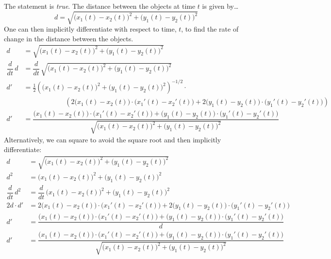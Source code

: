 \documentclass[11pt,letterpaper]{article}
\begin{document}
\sol The statement is \textit{true}. The distance between the objects at time $t$ is given by\dots
	\[
	d= \sqrt{ \big(x_1(t) - x_2(t) \big)^2 + \big(y_1(t) - y_2(t) \big)^2}
	\]
One can then implicitly differentiate with respect to time, $t$, to find the rate of change in the distance between the objects. 
	\[
	\begin{aligned}
	d&= \sqrt{ \big(x_1(t) - x_2(t) \big)^2 + \big(y_1(t) - y_2(t) \big)^2} \\[0.2cm]
	\dfrac{d}{dt} \, d&= \dfrac{d}{dt}\, \sqrt{ \big(x_1(t) - x_2(t) \big)^2 + \big(y_1(t) - y_2(t) \big)^2} \\[0.2cm]
	d'&= \frac{1}{2} \left( \big(x_1(t) - x_2(t) \big)^2 + \big(y_1(t) - y_2(t) \big)^2 \right)^{-1/2} \cdot \\[0.2cm]
	\phantom{d'}&\phantom{= -----} \left( 2 \big(x_1(t) - x_2(t) \big) \cdot \big(x_1'(t) - x_2'(t) \big) + 2 \big( y_1(t) - y_2(t) \big) \cdot \big( y_1'(t) - y_2'(t) \big) \right)  \\[0.2cm]
	d'&= \dfrac{\big(x_1(t) - x_2(t) \big) \cdot \big(x_1'(t) - x_2'(t) \big) + \big( y_1(t) - y_2(t) \big) \cdot \big( y_1'(t) - y_2'(t) \big)}{\sqrt{\big(x_1(t) - x_2(t) \big)^2 + \big(y_1(t) - y_2(t) \big)^2}}
	\end{aligned}
	\]
Alternatively, we can square to avoid the square root and then implicitly differentiate: 
	\[
	\begin{aligned}
	d&= \sqrt{ \big(x_1(t) - x_2(t) \big)^2 + \big(y_1(t) - y_2(t) \big)^2} \\[0.2cm]
	d^2&= \big(x_1(t) - x_2(t) \big)^2 + \big(y_1(t) - y_2(t) \big)^2 \\[0.2cm]
	\dfrac{d}{dt}\, d^2 &= \dfrac{d}{dt}\, \big(x_1(t) - x_2(t) \big)^2 + \big(y_1(t) - y_2(t) \big)^2 \\[0.2cm]
	2d \cdot d' &= 2 \big(x_1(t) - x_2(t) \big) \cdot \big(x_1'(t) - x_2'(t) \big) + 2 \big(y_1(t) - y_2(t) \big) \cdot \big(y_1'(t) - y_2'(t) \big) \\[0.2cm]
	d' &= \dfrac{\big(x_1(t) - x_2(t) \big) \cdot \big(x_1'(t) - x_2'(t) \big) + \big(y_1(t) - y_2(t) \big) \cdot \big(y_1'(t) - y_2'(t) \big)}{d} \\[0.2cm]
	d' &= \dfrac{\big(x_1(t) - x_2(t) \big) \cdot \big(x_1'(t) - x_2'(t) \big) + \big(y_1(t) - y_2(t) \big) \cdot \big(y_1'(t) - y_2'(t) \big)}{\sqrt{ \big(x_1(t) - x_2(t) \big)^2 + \big(y_1(t) - y_2(t) \big)^2}}
	\end{aligned}
	\] \pvspace{1.3cm}
\end{document}
